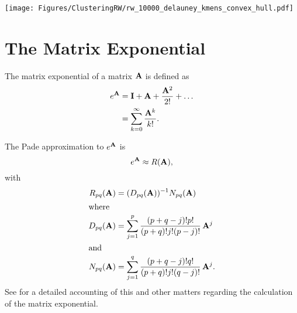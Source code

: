 \texttt{[image: Figures/ClusteringRW/rw\_10000\_delauney\_kmens\_convex\_hull.pdf]}


\section*{The Matrix Exponential}
The matrix exponential of a matrix $\mathbf{A}$ is defined as
\begin{align*}
  e^{\mathbf{A}}
  &= \mathbf{I} + \mathbf{A} + \frac{\mathbf{A}^2}{2!} + \dots \\
  &= \sum_{k = 0}^\infty \frac{\mathbf{A}^k}{k!}.
\end{align*}

The Pade approximation to
$e^{\mathbf{A}}$ is
\begin{displaymath}
  e^{\mathbf{A}} \approx R(\mathbf{A}),
\end{displaymath}
with
\begin{align*}
  R_{pq} (\mathbf{A})
  &= (D_{pq}(\mathbf{A}))^{-1} N_{pq}(\mathbf{A}) \\
  \intertext{where}
  D_{pq}(\mathbf{A})
  &= \sum_{j=1}^p \frac{(p+q-j)! p!}{ (p+q)!j!(p-j)!}\, \mathbf{A}^j \\
  \intertext{and}
  N_{pq}(\mathbf{A})
  &= \sum_{j=1}^q \frac{(p+q-j)! q!}{ (p+q)!j!(q-j)!}\, \mathbf{A}^j.
\end{align*}
See \cite{Moler78nineteendubious} for a detailed accounting of this and other matters regarding the calculation of the matrix exponential.
